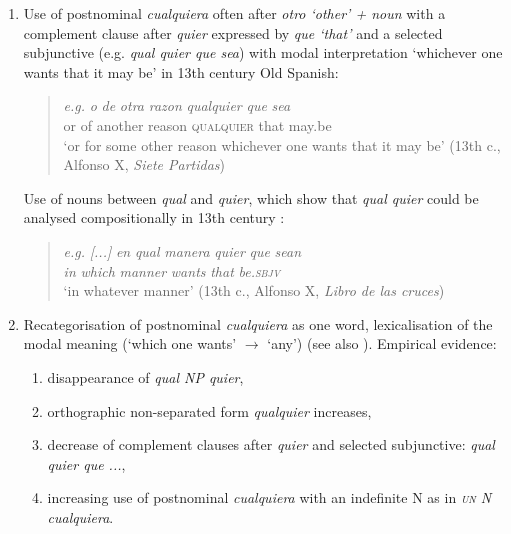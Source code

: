   \begin{enumerate}[label=\arabic*., leftmargin=2em]
    \item Use of postnominal \textit{cualquiera} often after \textit{otro ‘other’ + noun} with a complement clause after \textit{quier} expressed by \textit{que ‘that’} and a selected subjunctive (e.g. \textit{qual quier que sea}) with modal interpretation ‘whichever one wants that it may be’ in 13th century Old Spanish:
    \begin{quote}
        \gll \textit{e.g.} \textit{o} \textit{de} \textit{otra} \textit{razon} \textit{qualquier} \textit{que} \textit{sea}\\
        {} or of another reason \textsc{qualquier} that may.be\\
        \glt ‘or for some other reason whichever one wants that it may be’ (13th c., Alfonso X, \textit{Siete Partidas})
    \end{quote}
    
    Use of nouns between \textit{qual} and \textit{quier}, which show that \textit{qual quier} could be analysed compositionally in 13th century \citep{Pato2012}:
    \begin{quote}
        \gll \textit{e.g.} \textit{[...]} \textit{en} \textit{qual} \textit{manera} \textit{quier} \textit{que} \textit{sean}\\
         {} {} \textit{in} \textit{which} \textit{manner} \textit{wants} \textit{that} \textit{be.\textsc{sbjv}}\\
        \glt ‘in whatever manner’ (13th c., Alfonso X, \textit{Libro de las cruces})
    \end{quote}

    \item Recategorisation of postnominal \textit{cualquiera} as one word, lexicalisation of the modal meaning (‘which one wants’ $\rightarrow$ ‘any’) (see also \citealt{Elvira2007}). Empirical evidence:
    \begin{enumerate}[label=\alph*), leftmargin=1.5em]
        \item disappearance of \textit{qual NP quier}, 
        \item orthographic non-separated form \textit{qualquier} increases, 
        \item decrease of complement clauses after \textit{quier} and selected subjunctive: \textit{qual quier que ...}, 
        \item increasing use of postnominal \textit{cualquiera} with an indefinite N as in \textit{\textsc{un} N cualquiera}.
    \end{enumerate}


\end{enumerate}
